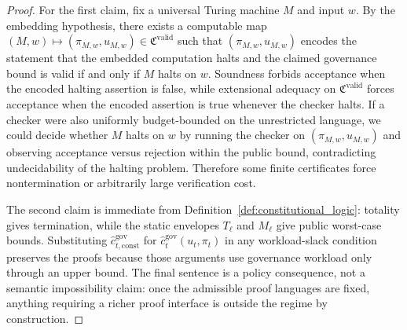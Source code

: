 \documentclass[11pt]{article}
\theoremstyle{definition}
\newcommand{\1}{\mathbf{1}}
\begin{document}
\begin{proof}
For the first claim, fix a universal Turing machine $M$ and input $w$. By the embedding hypothesis, there exists a computable map $(M,w)\mapsto (\pi_{M,w},u_{M,w})\in \mathfrak C^{\mathrm{valid}}$ such that $(\pi_{M,w},u_{M,w})$ encodes the statement that the embedded computation halts and the claimed governance bound is valid if and only if $M$ halts on $w$. Soundness forbids acceptance when the encoded halting assertion is false, while extensional adequacy on $\mathfrak C^{\mathrm{valid}}$ forces acceptance when the encoded assertion is true whenever the checker halts. If a checker were also uniformly budget-bounded on the unrestricted language, we could decide whether $M$ halts on $w$ by running the checker on $(\pi_{M,w},u_{M,w})$ and observing acceptance versus rejection within the public bound, contradicting undecidability of the halting problem. Therefore some finite certificates force nontermination or arbitrarily large verification cost.

The second claim is immediate from Definition~\ref{def:constitutional_logic}: totality gives termination, while the static envelopes $T_\ell$ and $M_\ell$ give public worst-case bounds. Substituting $\widehat c_{t,\mathrm{const}}^{\mathrm{gov}}$ for $\widehat c_t^{\mathrm{gov}}(u_t,\pi_t)$ in any workload-slack condition preserves the proofs because those arguments use governance workload only through an upper bound. The final sentence is a policy consequence, not a semantic impossibility claim: once the admissible proof languages are fixed, anything requiring a richer proof interface is outside the regime by construction.
\end{proof}
\end{document}

